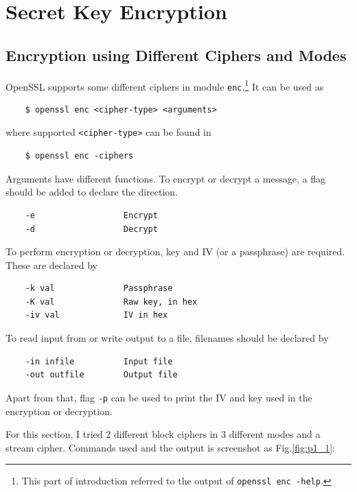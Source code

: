 \section{Secret Key Encryption}

\subsection{Encryption using Different Ciphers and Modes}

OpenSSL supports some different ciphers in module \texttt{enc}.\footnote{This part of introduction referred to the output of \texttt{openssl enc -help}.}
It can be used as 
\begin{verbatim}
    $ openssl enc <cipher-type> <arguments>
\end{verbatim}
where supported \texttt{<cipher-type>} can be found in 
\begin{verbatim}
    $ openssl enc -ciphers
\end{verbatim}

Arguments have different functions. 
To encrypt or decrypt a message, a flag should be added to declare the direction.
\begin{verbatim}
    -e                  Encrypt
    -d                  Decrypt
\end{verbatim}
To perform encryption or decryption, key and IV (or a passphrase) are required. These are declared by 
\begin{verbatim}
    -k val              Passphrase
    -K val              Raw key, in hex
    -iv val             IV in hex
\end{verbatim}
To read input from or write output to a file, filenames should be declared by 
\begin{verbatim}
    -in infile          Input file
    -out outfile        Output file
\end{verbatim}
Apart from that, flag \texttt{-p} can be used to print the IV and key used in the encryption or decryption.

For this section, I tried 2 different block ciphers in 3 different modes and a stream cipher.
Commands used and the output is screenshot as Fig.\ref{fig:p1_1}:

